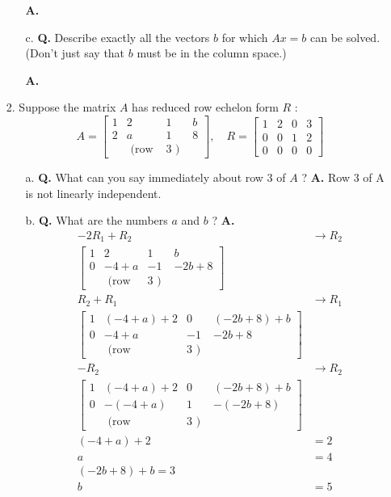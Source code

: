 \documentclass[main.tex]{subfiles}
\begin{document}
\begin{enumerate}
\begin{enumerate}
    \textbf{A.}
    
    \item [c.] \textbf{Q.} Describe exactly all the vectors $b$ for which $A x=b$ can be solved. (Don't just say that $b$ must be in the column space.) 
    
    \textbf{A.}
\end{enumerate}

\item [2.] Suppose the matrix $A$ has reduced row echelon form $R$ :
$$
A=\left[\begin{array}{cccc}
1 & 2 & 1 & b \\
2 & a & 1 & 8 \\
& \text { (row } & 3 \text { ) }
\end{array}\right], \quad R=\left[\begin{array}{llll}
1 & 2 & 0 & 3 \\
0 & 0 & 1 & 2 \\
0 & 0 & 0 & 0
\end{array}\right]
$$
\begin{enumerate}
    \item [a.] \textbf{Q.} What can you say immediately about row 3 of $A$ ? 
    \textbf{A.} Row 3 of A is not linearly independent.
    
    \item [b.] \textbf{Q.} What are the numbers $a$ and $b$ ? \textbf{A.}
    $$
    \begin{aligned}
    -2R_1+R_2 & \rightarrow R_2\\
    \left[\begin{array}{cccc}
    1 & 2 & 1 & b \\
    0 & -4+a & -1 & -2b+8 \\
    & \text { (row } & 3 \text { ) }
    \end{array}\right]&\\
    R_2+R_1 &\rightarrow R_1\\
    \left[\begin{array}{cccc}
    1 & (-4+a)+2 & 0 & (-2b+8) + b \\
    0 & -4+a & -1 & -2b+8 \\
    & \text { (row } & 3 \text { ) }
    \end{array}\right]&\\
    -R_2 &\rightarrow R_2\\
    \left[\begin{array}{cccc}
    1 & (-4+a)+2 & 0 & (-2b+8) + b \\
    0 & -(-4+a) & 1 & -(-2b+8) \\
    & \text { (row } & 3 \text { ) }
    \end{array}\right]&\\
    (-4+a)+2 & = 2\\
    a & = 4\\
    (-2b+8) + b = 3\\
    b & = 5
    \end{aligned}
    $$


\end{enumerate}
\end{enumerate}
\end{document}
